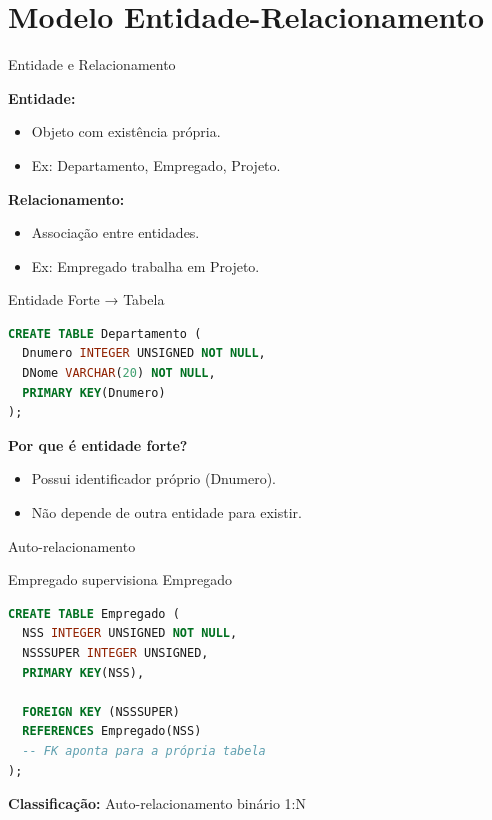 \documentclass{beamer}
\begin{document}
\section{Modelo Entidade-Relacionamento}

\begin{frame}{Entidade e Relacionamento}

\textbf{Entidade:}
\begin{itemize}
\item Objeto com existência própria.
\item Ex: Departamento, Empregado, Projeto.
\end{itemize}

\textbf{Relacionamento:}
\begin{itemize}
\item Associação entre entidades.
\item Ex: Empregado trabalha em Projeto.
\end{itemize}

\end{frame}

\begin{frame}[fragile]{Entidade Forte → Tabela}

\begin{lstlisting}[language=SQL]
CREATE TABLE Departamento (
  Dnumero INTEGER UNSIGNED NOT NULL,
  DNome VARCHAR(20) NOT NULL,
  PRIMARY KEY(Dnumero)
);
\end{lstlisting}

\textbf{Por que é entidade forte?}
\begin{itemize}
\item Possui identificador próprio (Dnumero).
\item Não depende de outra entidade para existir.
\end{itemize}

\end{frame}

\begin{frame}[fragile]{Auto-relacionamento}

Empregado supervisiona Empregado

\begin{lstlisting}[language=SQL]
CREATE TABLE Empregado (
  NSS INTEGER UNSIGNED NOT NULL,
  NSSSUPER INTEGER UNSIGNED,
  PRIMARY KEY(NSS),

  FOREIGN KEY (NSSSUPER)
  REFERENCES Empregado(NSS)
  -- FK aponta para a própria tabela
);
\end{lstlisting}

\textbf{Classificação:}
Auto-relacionamento binário 1:N

\end{frame}
\end{document}
